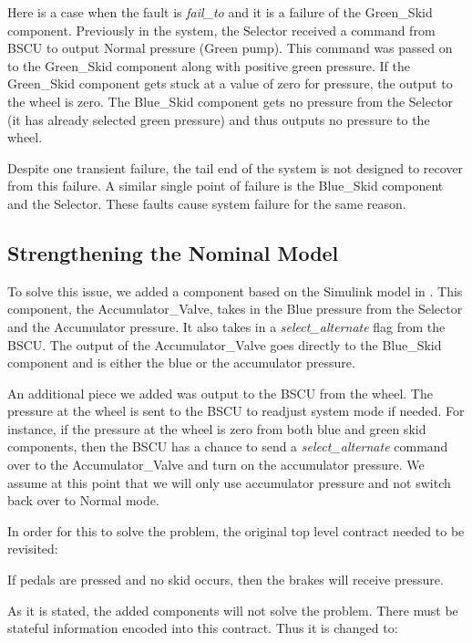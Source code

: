 Here is a case when the fault is \textit{fail\_to} and it is a failure of the Green\_Skid component. Previously in the system, the Selector received a command from BSCU to output Normal pressure (Green pump). This command was passed on to the Green\_Skid component along with positive green pressure. If the Green\_Skid component gets stuck at a value of zero for pressure, the output to the wheel is zero. The Blue\_Skid component gets no pressure from the Selector (it has already selected green pressure) and thus outputs no pressure to the wheel. 

Despite one transient failure, the tail end of the system is not designed to recover from this failure. A similar single point of failure is the Blue\_Skid component and the Selector. These faults cause system failure for the same reason. 

\subsection{Strengthening the Nominal Model}

To solve this issue, we added a component based on the Simulink model in \cite{Joshi05:Dasc}. This component, the Accumulator\_Valve, takes in the Blue pressure from the Selector and the Accumulator pressure. It also takes in a \textit{select\_alternate} flag from the BSCU. The output of the Accumulator\_Valve goes directly to the Blue\_Skid component and is either the blue or the accumulator pressure. 

An additional piece we added was output to the BSCU from the wheel. The pressure at the wheel is sent to the BSCU to readjust system mode if needed. For instance, if the pressure at the wheel is zero from both blue and green skid components, then the BSCU has a chance to send a \textit{select\_alternate} command over to the Accumulator\_Valve and turn on the accumulator pressure. We assume at this point that we will only use accumulator pressure and not switch back over to Normal mode. 

In order for this to solve the problem, the original top level contract needed to be revisited: 

\begin{tt}
If pedals are pressed and no skid occurs, then the brakes will receive pressure. 
\end{tt}

As it is stated, the added components will not solve the problem. There must be stateful information encoded into this contract. Thus it is changed to: 

